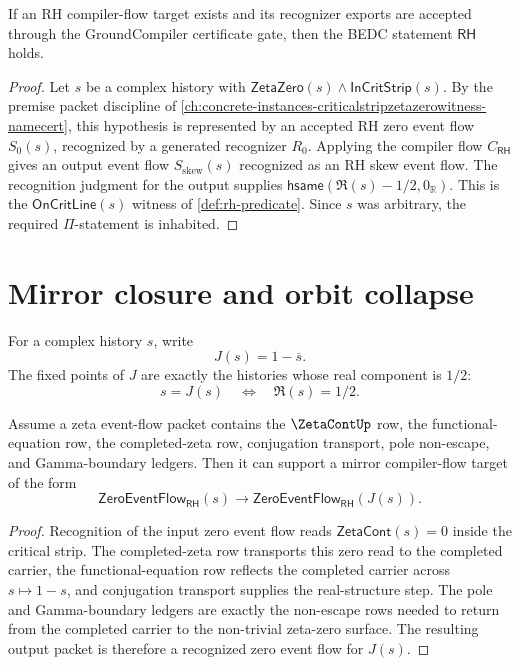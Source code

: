 \begin{theorem}
\label{thm:rh-compiler-flow-target-implies-rh}
If an RH compiler-flow target exists and its recognizer exports are accepted
through the GroundCompiler certificate gate, then the BEDC statement
$\mathsf{RH}$ holds.
\end{theorem}

\begin{proof}
Let $s$ be a complex history with
$\mathsf{ZetaZero}(s)\wedge\mathsf{InCritStrip}(s)$.  By the premise packet
discipline of \autoref{ch:concrete-instances-criticalstripzetazerowitness-namecert},
this hypothesis is represented by an accepted RH zero event flow
$S_0(s)$, recognized by a generated recognizer $R_0$.  Applying the compiler
flow $C_{\mathsf{RH}}$ gives an output event flow
$S_{\mathrm{skew}}(s)$ recognized as an RH skew event flow.  The recognition
judgment for the output supplies
$\mathsf{hsame}(\Re(s)-1/2,0_{\mathbb R})$.  This is the
$\mathsf{OnCritLine}(s)$ witness of \autoref{def:rh-predicate}.  Since $s$
was arbitrary, the required $\Pi$-statement is inhabited.
\end{proof}

\section{Mirror closure and orbit collapse}
\label{sec:rh-mirror-closure-orbit-collapse}

\begin{definition}
\label{def:rh-mirror-map}
For a complex history $s$, write
$$
J(s)=1-\overline{s}.
$$
The fixed points of $J$ are exactly the histories whose real component is
$1/2$:
$$
s=J(s)
\quad\Longleftrightarrow\quad
\Re(s)=1/2.
$$
\end{definition}

\begin{theorem}
\label{thm:rh-functional-equation-gives-mirror-closure}
Assume a zeta event-flow packet contains the $\ZetaContUp$ row, the
functional-equation row, the completed-zeta row, conjugation transport, pole
non-escape, and Gamma-boundary ledgers.  Then it can support a mirror
compiler-flow target of the form
$$
\mathsf{ZeroEventFlow}_{\mathsf{RH}}(s)
\to
\mathsf{ZeroEventFlow}_{\mathsf{RH}}(J(s)).
$$
\end{theorem}

\begin{proof}
Recognition of the input zero event flow reads
$\mathsf{ZetaCont}(s)=0$ inside the critical strip.  The completed-zeta row
transports this zero read to the completed carrier, the functional-equation
row reflects the completed carrier across $s\mapsto 1-s$, and conjugation
transport supplies the real-structure step.  The pole and Gamma-boundary
ledgers are exactly the non-escape rows needed to return from the completed
carrier to the non-trivial zeta-zero surface.  The resulting output packet is
therefore a recognized zero event flow for $J(s)$.
\end{proof}

